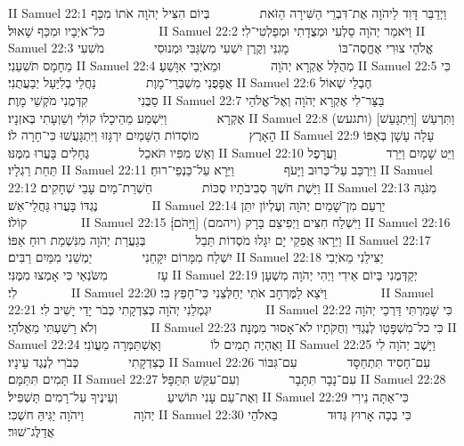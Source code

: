 II Samuel 22:1	וַיְדַבֵּר דָּוִד לַיהֹוָה אֶת־דִּבְרֵי הַשִּׁירָה הַזֹּאת        בְּיוֹם הִצִּיל יְהֹוָה אֹתוֹ מִכַּף כּל־אֹיְבָיו וּמִכַּף שָׁאוּל׃        
II Samuel 22:2	וַיֹּאמַר יְהֹוָה סַלְעִי וּמְצֻדָתִי וּמְפַלְטִי־לִי׃
II Samuel 22:3	אֱלֹהֵי צוּרִי אֶחֱסֶה־בּוֹ        מָגִנִּי וְקֶרֶן יִשְׁעִי מִשְׂגַּבִּי וּמְנוּסִי        מֹשִׁעִי מֵחָמָס תֹּשִׁעֵנִי׃
II Samuel 22:4	מְהֻלָּל אֶקְרָא יְהֹוָה        וּמֵאֹיְבַי אִוָּשֵׁעַ׃
II Samuel 22:5	כִּי אֲפָפֻנִי מִשְׁבְּרֵי־מָוֶת        נַחֲלֵי בְלִיַּעַל יְבַעֲתֻנִי׃
II Samuel 22:6	חֶבְלֵי שְׁאוֹל סַבֻּנִי        קִדְּמֻנִי מֹקְשֵׁי מָוֶת׃
II Samuel 22:7	בַּצַּר־לִי אֶקְרָא יְהֹוָה וְאֶל־אֱלֹהַי אֶקְרָא        וַיִּשְׁמַע מֵהֵיכָלוֹ קוֹלִי וְשַׁוְעָתִי בְּאזְנָיו׃
II Samuel 22:8	(ותגעש) [וַיִּתְגָּעַשׁ] וַתִּרְעַשׁ הָאָרֶץ        מוֹסְדוֹת הַשָּׁמַיִם יִרְגָּזוּ וַיִּתְגָּעֲשׁוּ כִּי־חָרָה לוֹ׃
II Samuel 22:9	עָלָה עָשָׁן בְּאַפּוֹ וְאֵשׁ מִפִּיו תֹּאכֵל        גֶּחָלִים בָּעֲרוּ מִמֶּנּוּ׃
II Samuel 22:10	וַיֵּט שָׁמַיִם וַיֵּרַד        וַעֲרָפֶל תַּחַת רַגְלָיו׃
II Samuel 22:11	וַיִּרְכַּב עַל־כְּרוּב וַיָּעֹף        וַיֵּרָא עַל־כַּנְפֵי־רוּחַ׃
II Samuel 22:12	וַיָּשֶׁת חֹשֶׁךְ סְבִיבֹתָיו סֻכּוֹת        חַשְׁרַת־מַיִם עָבֵי שְׁחָקִים׃
II Samuel 22:13	מִנֹּגַהּ נֶגְדּוֹ בָּעֲרוּ גַּחֲלֵי־אֵשׁ׃        
II Samuel 22:14	יַרְעֵם מִן־שָׁמַיִם יְהֹוָה וְעֶלְיוֹן יִתֵּן קוֹלוֹ׃        
II Samuel 22:15	וַיִּשְׁלַח חִצִּים וַיְפִיצֵם בָּרָק (ויהמם) [וַיָּהֹם]׃
II Samuel 22:16	וַיֵּרָאוּ אֲפִקֵי יָם יִגָּלוּ מֹסְדוֹת תֵּבֵל        בְּגַעֲרַת יְהֹוָה מִנִּשְׁמַת רוּחַ אַפּוֹ׃
II Samuel 22:17	יִשְׁלַח מִמָּרוֹם יִקָּחֵנִי        יַמְשֵׁנִי מִמַּיִם רַבִּים׃
II Samuel 22:18	יַצִּילֵנִי מֵאֹיְבִי עָז        מִשֹּׂנְאַי כִּי אָמְצוּ מִמֶּנִּי׃
II Samuel 22:19	יְקַדְּמֻנִי בְּיוֹם אֵידִי וַיְהִי יְהֹוָה מִשְׁעָן לִי׃        
II Samuel 22:20	וַיֹּצֵא לַמֶּרְחָב אֹתִי יְחַלְּצֵנִי כִּי־חָפֵץ בִּי׃        
II Samuel 22:21	יִגְמְלֵנִי יְהֹוָה כְּצִדְקָתִי כְּבֹר יָדַי יָשִׁיב לִי׃        
II Samuel 22:22	כִּי שָׁמַרְתִּי דַּרְכֵי יְהֹוָה וְלֹא רָשַׁעְתִּי מֵאֱלֹהָי׃        
II Samuel 22:23	כִּי כל־מִשְׁפָּטָו לְנֶגְדִּי וְחֻקֹּתָיו לֹא־אָסוּר מִמֶּנָּה׃
II Samuel 22:24	וָאֶהְיֶה תָמִים לוֹ        וָאֶשְׁתַּמְּרָה מֵעֲוֺנִי׃
II Samuel 22:25	וַיָּשֶׁב יְהֹוָה לִי כְּצִדְקָתִי        כְּבֹרִי לְנֶגֶד עֵינָיו׃
II Samuel 22:26	עִם־חָסִיד תִּתְחַסָּד        עִם־גִּבּוֹר תָּמִים תִּתַּמָּם׃
II Samuel 22:27	עִם־נָבָר תִּתָּבָר        וְעִם־עִקֵּשׁ תִּתַּפָּל׃
II Samuel 22:28	וְאֶת־עַם עָנִי תּוֹשִׁיעַ        וְעֵינֶיךָ עַל־רָמִים תַּשְׁפִּיל׃
II Samuel 22:29	כִּי־אַתָּה נֵירִי יְהֹוָה        וַיהֹוָה יַגִּיהַּ חשְׁכִּי׃
II Samuel 22:30	כִּי בְכָה אָרוּץ גְּדוּד        בֵּאלֹהַי אֲדַלֶּג־שׁוּר׃
